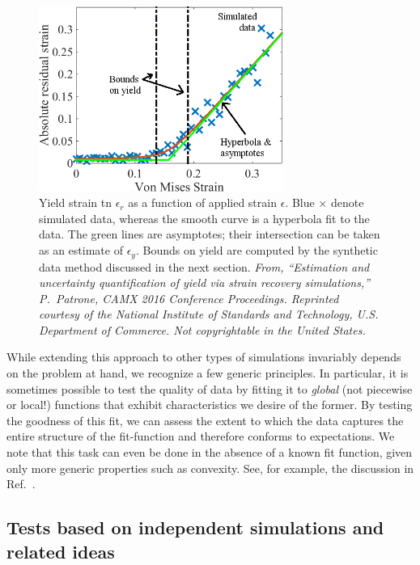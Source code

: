 \begin{figure}
\includegraphics[width=8cm]{hyperbola.png}\caption{Yield strain tn $\epsilon_r$ as a function of applied strain $\epsilon$.  Blue $\times$ denote simulated data, whereas the smooth curve is a hyperbola fit to the data.  The green lines are asymptotes; their intersection can be taken as an estimate of $\epsilon_y$.    Bounds on yield are computed by the synthetic data method discussed in the next section.  {\it From, ``Estimation and uncertainty quantification of yield via strain recovery simulations,'' P.\ Patrone, CAMX 2016 Conference Proceedings.  Reprinted courtesy of the National Institute of Standards and Technology, U.S. Department of Commerce. Not copyrightable in the United States.}}\label{fig:yield}
\end{figure}

While extending this approach to other types of simulations invariably depends on the problem at hand, we recognize a few generic principles.  In particular, it is sometimes possible to test the quality of data by fitting it to {\it global} (not piecewise or local!) functions that exhibit characteristics we desire of the former.  By testing the goodness of this fit, we can assess the extent to which the data captures the entire structure of the fit-function and therefore conforms to expectations.  We note that this task can even be done in the absence of a known fit function, given only more generic properties such as convexity.  See, for example, the discussion in Ref.~\cite{PatroneAIAA}.  


\subsection{Tests based on independent simulations and related ideas}

